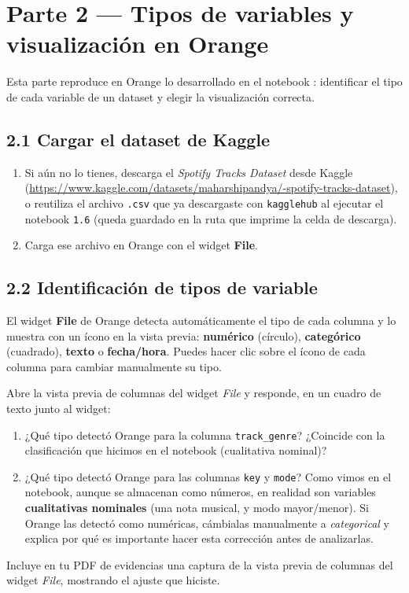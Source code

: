 \documentclass[11pt,letterpaper]{article}
\begin{document}
\section{Parte 2 --- Tipos de variables y visualización en Orange}

Esta parte reproduce en Orange lo desarrollado en el notebook \texttt{}: identificar el tipo de cada variable de un dataset y elegir la visualización correcta.

\subsection{2.1 Cargar el dataset de Kaggle}

\begin{enumerate}[leftmargin=1.2cm]
  \item Si aún no lo tienes, descarga el \textit{Spotify Tracks Dataset} desde Kaggle (\url{https://www.kaggle.com/datasets/maharshipandya/-spotify-tracks-dataset}), o reutiliza el archivo \texttt{.csv} que ya descargaste con \texttt{kagglehub} al ejecutar el notebook \texttt{1.6} (queda guardado en la ruta que imprime la celda de descarga).
  \item Carga ese archivo en Orange con el widget \textbf{File}.
\end{enumerate}

\subsection{2.2 Identificación de tipos de variable}

El widget \textbf{File} de Orange detecta automáticamente el tipo de cada columna y lo muestra con un ícono en la vista previa: \textbf{numérico} (círculo), \textbf{categórico} (cuadrado), \textbf{texto} o \textbf{fecha/hora}. Puedes hacer clic sobre el ícono de cada columna para cambiar manualmente su tipo.

\begin{actividad}
Abre la vista previa de columnas del widget \textit{File} y responde, en un cuadro de texto junto al widget:
\begin{enumerate}[label=\alph*)]
  \item ¿Qué tipo detectó Orange para la columna \texttt{track\_genre}? ¿Coincide con la clasificación que hicimos en el notebook (cualitativa nominal)?
  \item ¿Qué tipo detectó Orange para las columnas \texttt{key} y \texttt{mode}? Como vimos en el notebook, aunque se almacenan como números, en realidad son variables \textbf{cualitativas nominales} (una nota musical, y modo mayor/menor). Si Orange las detectó como numéricas, cámbialas manualmente a \textit{categorical} y explica por qué es importante hacer esta corrección antes de analizarlas.
\end{enumerate}
Incluye en tu PDF de evidencias una captura de la vista previa de columnas del widget \textit{File}, mostrando el ajuste que hiciste.
\end{actividad}
\end{document}
